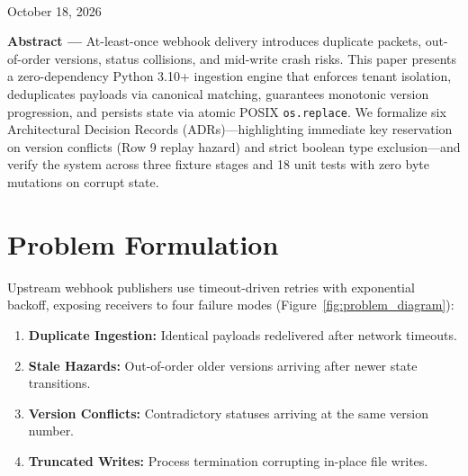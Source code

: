 \documentclass[10pt,a4paper]{article}
\begin{document}
\vspace*{-1.5em}
\noindent{\color{gblue}\rule{\textwidth}{1.5pt}}
\vspace{0.2em}


\vspace{0.5em}
 \\
{\footnotesize\color{gslate} October 18, 2026 }
\vspace{0.4em}

\begin{tcolorbox}[colback=gbg, colframe=gborder, boxrule=0.5pt, arc=2pt, left=10pt, right=10pt, top=6pt, bottom=6pt]
\footnotesize\noindent\textbf{\color{gdark}Abstract ---}
At-least-once webhook delivery introduces duplicate packets, out-of-order versions, status collisions, and mid-write crash risks. This paper presents a zero-dependency Python 3.10+ ingestion engine that enforces tenant isolation, deduplicates payloads via canonical matching, guarantees monotonic version progression, and persists state via atomic POSIX \texttt{os.replace}. We formalize six Architectural Decision Records (ADRs)—highlighting immediate key reservation on version conflicts (Row 9 replay hazard) and strict boolean type exclusion—and verify the system across three fixture stages and 18 unit tests with zero byte mutations on corrupt state.
\end{tcolorbox}
\vspace{0.3em}

\section{Problem Formulation}

Upstream webhook publishers use timeout-driven retries with exponential backoff, exposing receivers to four failure modes (Figure~\ref{fig:problem_diagram}):
\begin{enumerate}[leftmargin=1.5em, noitemsep, topsep=2pt]
    \item \textbf{Duplicate Ingestion:} Identical payloads redelivered after network timeouts.
    \item \textbf{Stale Hazards:} Out-of-order older versions arriving after newer state transitions.
    \item \textbf{Version Conflicts:} Contradictory statuses arriving at the same version number.
    \item \textbf{Truncated Writes:} Process termination corrupting in-place file writes.
\end{enumerate}
\end{document}
